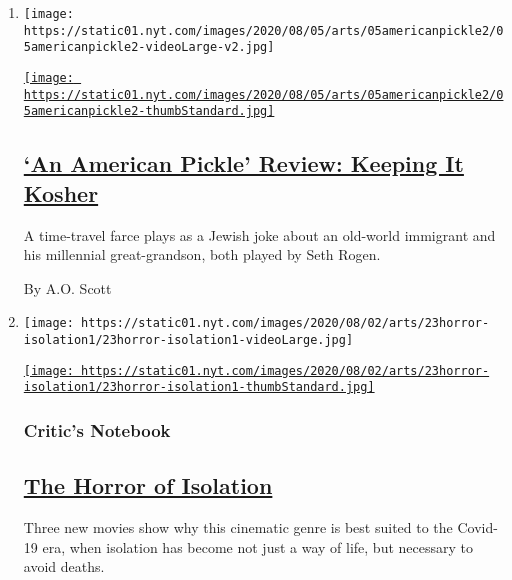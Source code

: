 \begin{enumerate}
\def\labelenumi{\arabic{enumi}.}
\item
  \texttt{[image: https://static01.nyt.com/images/2020/08/05/arts/05americanpickle2/05americanpickle2-videoLarge-v2.jpg]}

  \href{/2020/08/04/movies/an-american-pickle-review.html}{\texttt{[image: https://static01.nyt.com/images/2020/08/05/arts/05americanpickle2/05americanpickle2-thumbStandard.jpg]}}

  \hypertarget{an-american-pickle-review-keeping-it-kosher}{%
  \subsection{\texorpdfstring{\href{/2020/08/04/movies/an-american-pickle-review.html}{`An
  American Pickle' Review: Keeping It
  Kosher}}{`An American Pickle' Review: Keeping It Kosher}}\label{an-american-pickle-review-keeping-it-kosher}}

  A time-travel farce plays as a Jewish joke about an old-world
  immigrant and his millennial great-grandson, both played by Seth
  Rogen.

  By A.O. Scott
\item
  \texttt{[image: https://static01.nyt.com/images/2020/08/02/arts/23horror-isolation1/23horror-isolation1-videoLarge.jpg]}

  \href{/2020/07/29/movies/horror-she-dies-tomorrow-relic-amulet.html}{\texttt{[image: https://static01.nyt.com/images/2020/08/02/arts/23horror-isolation1/23horror-isolation1-thumbStandard.jpg]}}

  \hypertarget{critics-notebook}{%
  \subsubsection{Critic's Notebook}\label{critics-notebook}}

  \hypertarget{the-horror-of-isolation}{%
  \subsection{\texorpdfstring{\href{/2020/07/29/movies/horror-she-dies-tomorrow-relic-amulet.html}{The
  Horror of
  Isolation}}{The Horror of Isolation}}\label{the-horror-of-isolation}}

  Three new movies show why this cinematic genre is best suited to the
  Covid-19 era, when isolation has become not just a way of life, but
  necessary to avoid deaths.


\end{enumerate}
